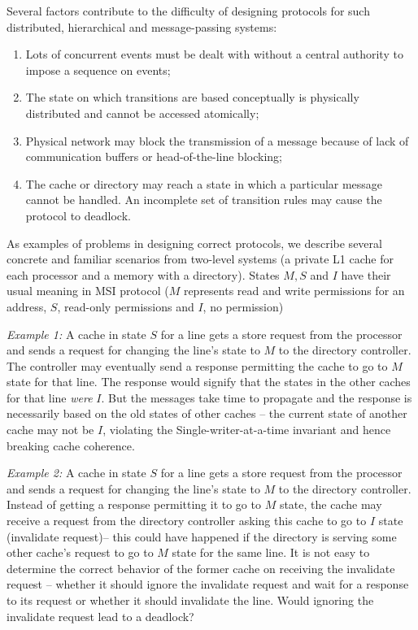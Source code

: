 Several factors contribute to the difficulty of designing protocols for such
distributed, hierarchical and message-passing systems:

\begin{enumerate} \item Lots of concurrent events must be dealt with without a
central authority to impose a sequence on events; \item The state on which
transitions are based conceptually is physically distributed and cannot be
accessed atomically; \item Physical network may block the transmission of a
message because of lack of communication buffers or head-of-the-line blocking;
\item The cache or directory may reach a state in which a particular message
cannot be handled. An incomplete set of transition rules may cause the protocol
to deadlock.  \end{enumerate}

As examples of problems in designing correct protocols, we describe several
concrete and familiar scenarios from two-level systems (a private L1 cache for
each processor and a memory with a directory). States $M, S$ and $I$ have their
usual meaning in MSI protocol ($M$ represents read and write permissions for an
address, $S$, read-only permissions and $I$, no permission)

\noindent \emph{Example 1:} A cache in state $S$ for a line gets a store
request from the processor and sends a request for changing the line's state to
$M$ to the directory controller. The controller may eventually send a response
permitting the cache to go to $M$ state for that line. The response would
signify that the states in the other caches for that line \emph{were} $I$. But
the messages take time to propagate and the response is necessarily based on
the old states of other caches -- the current state of another cache may not be
$I$, violating the Single-writer-at-a-time invariant and hence breaking cache
coherence.

\noindent \emph{Example 2:} A cache in state $S$ for a line gets a store
request from the processor and sends a request for changing the line's state to
$M$ to the directory controller. Instead of getting a response permitting it to
go to $M$ state, the cache may receive a request from the directory controller
asking this cache to go to $I$ state (invalidate request)-- this could have
happened if the directory is serving some other cache's request to go to $M$
state for the same line. It is not easy to determine the correct behavior of
the former cache on receiving the invalidate request -- whether it should
ignore the invalidate request and wait for a response to its request or whether
it should invalidate the line. Would ignoring the invalidate request lead to a
deadlock?

